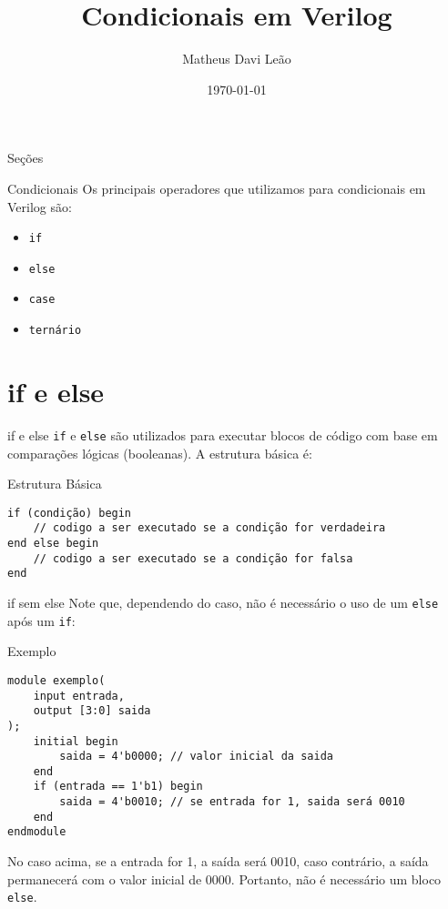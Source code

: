 \documentclass[aspectratio=169,xcolor=dvipsnames]{beamer}
\title{Condicionais em Verilog}
\author{Matheus Davi Leão}
\institute
{
    Poliware \\
    Escola Politécnica da Universidade de São Paulo
}
\date{\today}
\begin{document}
\begin{frame}
    \titlepage
\end{frame}

\begin{frame}{Seções}
    \tableofcontents
\end{frame}
\begin{frame}{Condicionais}
Os principais operadores que utilizamos para condicionais em Verilog são:

\begin{itemize}
  \item \texttt{if} 
  \item \texttt{else}
  \item \texttt{case}
  \item \texttt{ternário}
\end{itemize}
\end{frame}

\section{if e else}

\begin{frame}[fragile]{if e else}
\texttt{if} e \texttt{else} são utilizados para executar blocos de código com base em comparações lógicas (booleanas). A estrutura básica é:

\begin{block}{Estrutura Básica}
\begin{verbatim}
if (condição) begin
    // codigo a ser executado se a condição for verdadeira
end else begin
    // codigo a ser executado se a condição for falsa
end
\end{verbatim}
\end{block}
\end{frame}

\begin{frame}[fragile]{if sem else}
Note que, dependendo do caso, não é necessário o uso de um \texttt{else} após um \texttt{if}:

\begin{block}{Exemplo}
\begin{verbatim}
module exemplo(
    input entrada,
    output [3:0] saida 
);
    initial begin
        saida = 4'b0000; // valor inicial da saida
    end
    if (entrada == 1'b1) begin
        saida = 4'b0010; // se entrada for 1, saida será 0010
    end
endmodule
\end{verbatim}
\end{block}

No caso acima, se a entrada for 1, a saída será 0010, caso contrário, a saída permanecerá com o valor inicial de 0000. Portanto, não é necessário um bloco \texttt{else}.
\end{frame}
\end{document}
